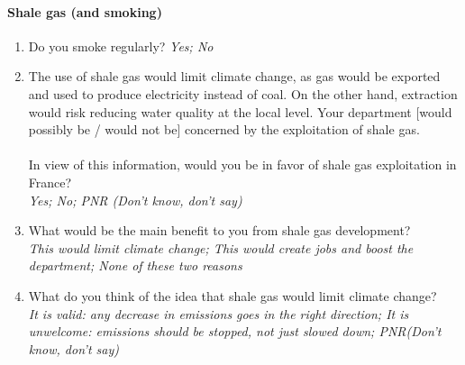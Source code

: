 \documentclass[english,5p,authoryear]{elsarticle}
\begin{document}
\begin{appendices}
\paragraph{Shale gas (and smoking)}
\begin{enumerate}[resume,leftmargin=*]
\item Do you smoke regularly? \emph{Yes; No }
\item The use of shale gas would limit climate change, as gas would be exported
and used to produce electricity instead of coal. On the other hand,
extraction would risk reducing water quality at the local level. Your
department {[}would possibly be / would not be{]} concerned by the exploitation
of shale gas. \\
\\
In view of this information, would you be in favor of shale gas exploitation
in France? \emph{}\\
\emph{Yes; No; PNR (Don't know, don't say) }
\item What would be the main benefit to you from shale gas development?
\emph{}\\
\emph{This would limit climate change; This would create jobs and
boost the department; None of these two reasons }
\item What do you think of the idea that shale gas would limit climate change?
\emph{}\\
\emph{It is valid: any decrease in emissions goes in the right direction;
It is unwelcome: emissions should be stopped, not just slowed down;
PNR(Don't know, don't say) }
\end{enumerate}


\end{appendices}
\end{document}
